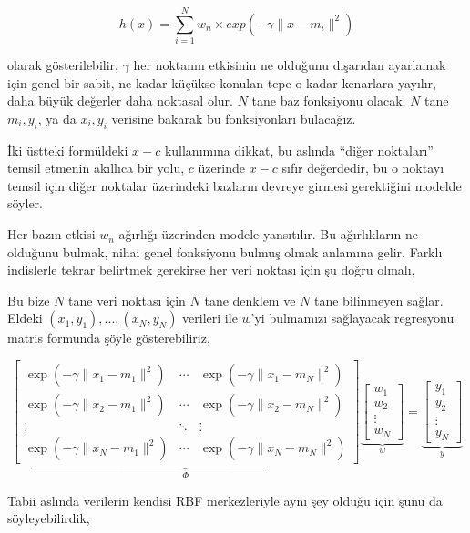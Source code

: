\documentclass[12pt,fleqn]{article}\usepackage{../../common}
\begin{document}
$$
h(x) = \sum_{i=1}^N w_n \times exp(-\gamma \|x-m_i\|^2)
$$

olarak gösterilebilir, $\gamma$ her noktanın etkisinin ne olduğunu
dışarıdan ayarlamak için genel bir sabit, ne kadar küçükse konulan tepe o
kadar kenarlara yayılır, daha büyük değerler daha noktasal olur. $N$ tane
baz fonksiyonu olacak, $N$ tane $m_i,y_i$, ya da $x_i,y_i$ verisine bakarak
bu fonksiyonları bulacağız. 

İki üstteki formüldeki $x-c$ kullanımına dikkat, bu aslında ``diğer noktaları''
temsil etmenin akıllıca bir yolu, $c$ üzerinde $x-c$ sıfır değerdedir, bu o
noktayı temsil için diğer noktalar üzerindeki bazların devreye girmesi
gerektiğini modelde söyler.

Her bazın etkisi $w_n$ ağırlığı üzerinden modele yansıtılır. Bu ağırlıkların ne
olduğunu bulmak, nihai genel fonksiyonu bulmuş olmak anlamına gelir. Farklı
indislerle tekrar belirtmek gerekirse her veri noktası için şu doğru olmalı,

Bu bize $N$ tane veri noktası için $N$ tane denklem ve $N$ tane bilinmeyen
sağlar. Eldeki $(x_1,y_1),...,(x_N,y_N)$ verileri ile $w$'yi bulmamızı
sağlayacak regresyonu matris formunda şöyle gösterebiliriz,

$$
\underbrace{
\left[\begin{array}{rrr} 
    \exp(-\gamma \|x_1-m_1\|^2) & \cdots & \exp(-\gamma \|x_1-m_N\|^2)\\ 
    \exp(-\gamma \|x_2-m_1\|^2) & \cdots & \exp(-\gamma \|x_2-m_N\|^2)\\ 
    \vdots & \ddots & \vdots \\ 
    \exp(-\gamma \|x_N-m_1\|^2) & \cdots & \exp(-\gamma \|x_N-m_N\|^2)
\end{array}\right]
}_{\Phi}
\underbrace{
\left[\begin{array}{r}
 w_1  \\ w_2  \\ \vdots \\  w_N
\end{array}\right]}_{w}
=
\underbrace{
\left[\begin{array}{rrr} y_1  \\
 y_2  \\ \vdots \\  y_N
\end{array}\right]}_{y}
$$

Tabii aslında verilerin kendisi RBF merkezleriyle aynı şey olduğu için
şunu da söyleyebilirdik, 
\end{document}
